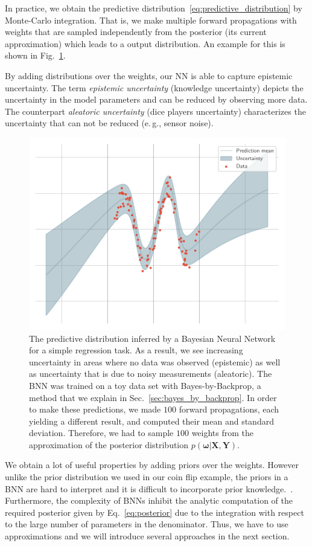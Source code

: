 \documentclass[runningheads]{llncs}
\begin{document}
In practice, we obtain the predictive distribution~\ref{eq:predictive_distribution} by Monte-Carlo integration.
That is, we make multiple forward propagations with weights that are sampled independently from the posterior (its current approximation) which leads to a output distribution. An example for this is shown in Fig.~\ref{fig:uncertainty_example}.

By adding distributions over the weights, our NN is able to capture epistemic uncertainty.
The term \textit{epistemic uncertainty} (knowledge uncertainty) depicts the uncertainty in the model parameters and can be reduced by observing more data. 
The counterpart \textit{aleatoric uncertainty} (dice players uncertainty) characterizes the uncertainty that can not be reduced (e.\,g., sensor noise). 
\begin{figure}
    \centering
    \includegraphics[width=.6\textwidth]{images/uncertainty_example.pdf}
    \caption{The predictive distribution inferred by a Bayesian Neural Network for a simple regression task. As a result, we see increasing uncertainty in areas where no data was observed (epistemic) as well as uncertainty that is due to noisy measurements (aleatoric). The BNN was trained on a toy data set with Bayes-by-Backprop, a method that we explain in Sec.~\ref{sec:bayes_by_backprop}.
    In order to make these predictions, we made $100$ forward propagations, each yielding a different result, and computed their mean and standard deviation. Therefore, we had to sample $100$ weights from the approximation of the posterior distribution $p(\boldsymbol{\omega}| \mathbf{X}, \mathbf{Y})$.}
    \label{fig:uncertainty_example}
\end{figure}

We obtain a lot of useful properties by adding priors over the weights.
However unlike the prior distribution we used in our coin flip example, the priors in a BNN are hard to interpret and it is difficult to incorporate prior knowledge.~\cite{Neal:1995:BLN:922680}.
Furthermore, the complexity of BNNs inhibit the analytic computation of the required posterior given by Eq.~\ref{eq:posterior} due to the integration with respect to the large number of parameters in the denominator.
Thus, we have to use approximations and we will introduce several approaches in the next section.
\end{document}
